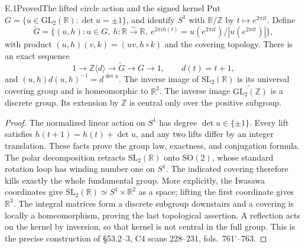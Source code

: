 \begin{statement}{E.1}{Proved}{The lifted circle action and the signed kernel}
Put $G=\{u\in\mathrm{GL}_2(\mathbb R):\det u=\pm1\}$, and identify
$S^1$ with $\mathbb R/\mathbb Z$ by $t\mapsto e^{2\pi it}$.  Define
\[
 \widetilde G=\{(u,h):u\in G,\ h:\mathbb R\xrightarrow{\sim}\mathbb R,
 \ e^{2\pi i h(t)}=u(e^{2\pi it})/|u(e^{2\pi it})|\},
\]
with product $(u,h)(v,k)=(uv,h\circ k)$ and the covering topology.
There is an exact sequence
\[
 1\longrightarrow\mathbb Z\langle d\rangle\longrightarrow
 \widetilde G\longrightarrow G\longrightarrow1,
 \qquad d(t)=t+1,
\]
and $(u,h)d(u,h)^{-1}=d^{\det u}$.  The inverse image of
$\mathrm{SL}_2(\mathbb R)$ is its universal covering group and is
homeomorphic to $\mathbb R^3$.  The inverse image
$\widetilde{\mathrm{GL}_2(\mathbb Z)}$ is a discrete group.  Its
extension by $\mathbb Z$ is central only over the positive subgroup.
\end{statement}
\begin{proof}
The normalized linear action on $S^1$ has degree $\det u\in\{\pm1\}$.
Every lift satisfies $h(t+1)=h(t)+\det u$, and any two lifts differ
by an integer translation.  These facts prove the group law, exactness,
and conjugation formula.  The polar decomposition retracts
$\mathrm{SL}_2(\mathbb R)$ onto $\mathrm{SO}(2)$, whose standard
rotation loop has winding number one on $S^1$.  The indicated covering
therefore kills exactly the whole fundamental group.  More explicitly,
the Iwasawa coordinates give
$\mathrm{SL}_2(\mathbb R)\simeq S^1\times\mathbb R^2$ as a space;
lifting the first coordinate gives $\mathbb R^3$.
The integral matrices form a discrete subgroup downstairs and a
covering is locally a homeomorphism, proving the last topological
assertion.  A reflection acts on the kernel by inversion, so that
kernel is not central in the full group.  This is the precise
construction of \S53.2--3, C4 scans 228--231, fols.~761'--763.
\end{proof}

